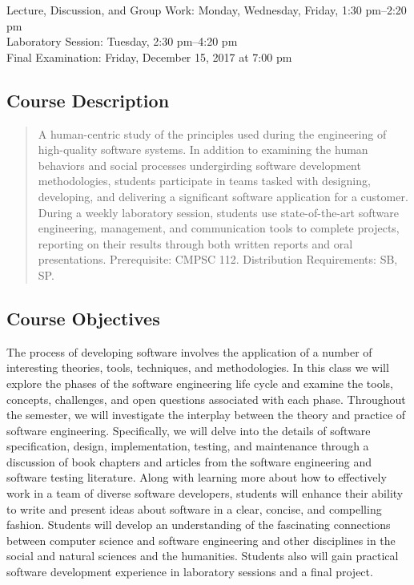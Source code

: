 \documentclass[11pt]{article}
\begin{document}
Lecture, Discussion, and Group Work: Monday, Wednesday, Friday, 1:30 pm--2:20 pm \\
Laboratory Session: Tuesday, 2:30 pm--4:20 pm \\
Final Examination: Friday, December 15, 2017 at 7:00 pm

\subsection*{Course Description}

\begin{quote}

  A human-centric study of the principles used during the engineering of high-quality software systems. In addition to
  examining the human behaviors and social processes undergirding software development methodologies, students participate
  in teams tasked with designing, developing, and delivering a significant software application for a customer. During a
  weekly laboratory session, students use state-of-the-art software engineering, management, and communication tools to
  complete projects, reporting on their results through both written reports and oral presentations. Prerequisite: CMPSC
  112. Distribution Requirements: SB, SP.

\end{quote}

\subsection*{Course Objectives}

The process of developing software involves the application of a number of interesting theories, tools, techniques, and
methodologies. In this class we will explore the phases of the software engineering life cycle and examine the tools,
concepts, challenges, and open questions associated with each phase. Throughout the semester, we will investigate the
interplay between the theory and practice of software engineering. Specifically, we will delve into the details of
software specification, design, implementation, testing, and maintenance through a discussion of book chapters and
articles from the software engineering and software testing literature. Along with learning more about how to
effectively work in a team of diverse software developers, students will enhance their ability to write and present
ideas about software in a clear, concise, and compelling fashion. Students will develop an understanding of the
fascinating connections between computer science and software engineering and other disciplines in the social and
natural sciences and the humanities. Students also will gain practical software development experience in laboratory
sessions and a final project.
\end{document}
